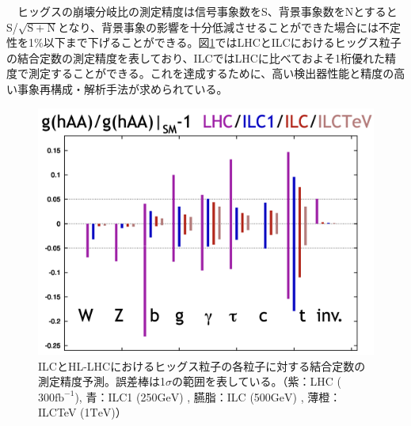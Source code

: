 　ヒッグスの崩壊分岐比の測定精度は信号事象数をS、背景事象数をNとするとS/$\mathrm{\sqrt{S+N}}$となり、背景事象の影響を十分低減させることができた場合には不定性を1\%以下まで下げることができる。図\ref{lhcvsilc}ではLHCとILCにおけるヒッグス粒子の結合定数の測定精度を表しており、ILCではLHCに比べておよそ1桁優れた精度で測定することができる。これを達成するために、高い検出器性能と精度の高い事象再構成・解析手法が求められている。
\begin{figure}[H]
	\begin{center}
 \includegraphics[keepaspectratio, scale=0.3]
 	{Figure/Introduction/lhcvsilc.png}
 		\caption{ILCとHL-LHCにおけるヒッグス粒子の各粒子に対する結合定数の測定精度予測。誤差棒は1$\sigma$の範囲を表している。（紫：LHC ($300 \mathrm{fb^{-1}}$), 青：ILC1 (250$\mathrm{GeV}$) , 臙脂：ILC (500$\mathrm{GeV}$) , 薄橙：ILCTeV (1$\mathrm{TeV}$)）\cite{decaybsm}}
 		\label{lhcvsilc}
	\end{center}
\end{figure}

